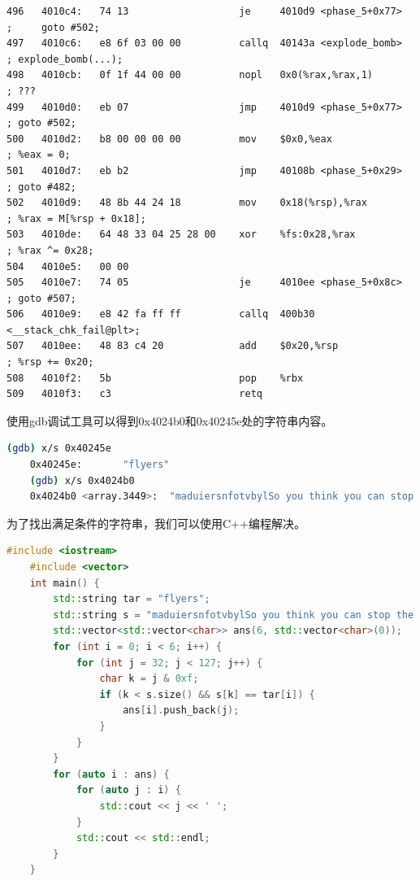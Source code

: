 \documentclass{article}
\begin{document}
\begin{lstlisting}[title = phase\_5对应的反汇编代码及注释, xleftmargin = 2em,xrightmargin = 2em, aboveskip = 1em, numbers = none, basicstyle=\footnotesize\ttfamily]
496   4010c4:   74 13                   je     4010d9 <phase_5+0x77>        ;     goto #502;
497   4010c6:   e8 6f 03 00 00          callq  40143a <explode_bomb>        ; explode_bomb(...);
498   4010cb:   0f 1f 44 00 00          nopl   0x0(%rax,%rax,1)             ; ???
499   4010d0:   eb 07                   jmp    4010d9 <phase_5+0x77>        ; goto #502;
500   4010d2:   b8 00 00 00 00          mov    $0x0,%eax                    ; %eax = 0;
501   4010d7:   eb b2                   jmp    40108b <phase_5+0x29>        ; goto #482;
502   4010d9:   48 8b 44 24 18          mov    0x18(%rsp),%rax              ; %rax = M[%rsp + 0x18];
503   4010de:   64 48 33 04 25 28 00    xor    %fs:0x28,%rax                ; %rax ^= 0x28;
504   4010e5:   00 00
505   4010e7:   74 05                   je     4010ee <phase_5+0x8c>        ; goto #507;
506   4010e9:   e8 42 fa ff ff          callq  400b30 <__stack_chk_fail@plt>;
507   4010ee:   48 83 c4 20             add    $0x20,%rsp                   ; %rsp += 0x20;
508   4010f2:   5b                      pop    %rbx
509   4010f3:   c3                      retq
  \end{lstlisting}

使用gdb调试工具可以得到0x4024b0和0x40245e处的字符串内容。

\begin{lstlisting}[language=bash]
    (gdb) x/s 0x40245e
    0x40245e:       "flyers"
    (gdb) x/s 0x4024b0
    0x4024b0 <array.3449>:  "maduiersnfotvbylSo you think you can stop the bomb with ctrl-c, do you?"
\end{lstlisting}

为了找出满足条件的字符串，我们可以使用C++编程解决。

\begin{lstlisting}[language=C++, title=解决此问题的C++代码]
    #include <iostream>
    #include <vector>
    int main() {
        std::string tar = "flyers";
        std::string s = "maduiersnfotvbylSo you think you can stop the bomb with ctrl-c, do you?";
        std::vector<std::vector<char>> ans(6, std::vector<char>(0));
        for (int i = 0; i < 6; i++) {
            for (int j = 32; j < 127; j++) {
                char k = j & 0xf;
                if (k < s.size() && s[k] == tar[i]) {
                    ans[i].push_back(j);
                }
            }
        }
        for (auto i : ans) {
            for (auto j : i) {
                std::cout << j << ' ';
            }
            std::cout << std::endl;
        }
    }
  \end{lstlisting}
\end{document}
